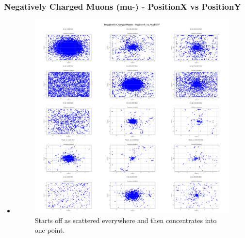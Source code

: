 \documentclass[aspectratio-169]{beamer}
\begin{document}
\begin{frame}
\frametitle{Negatively Charged Muons (mu-) - PositionX vs PositionY}
\begin{itemize}
    \item 
    \begin{minipage}{0.5\textwidth}
        \begin{figure}
            \centering
            \includegraphics[width=\textwidth]{Combined Plots/PositionX_vs_PositionY_mu-.png}
            \footnotesize{Starts off as scattered everywhere and then concentrates into one point.}
        \end{figure}
    \end{minipage}
\end{itemize}
\end{frame}

\end{document}
